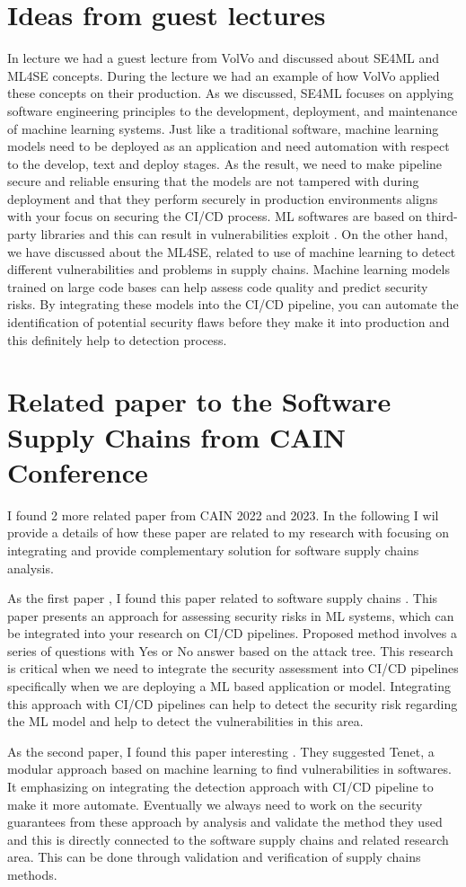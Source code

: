 \documentclass[11pt]{article}
\begin{document}
\section{Ideas from guest lectures}
In lecture we had a guest lecture from VolVo and discussed about SE4ML and ML4SE concepts. During the lecture we had an example of how VolVo applied these concepts on their production. As we discussed, SE4ML focuses on applying software engineering principles to the development, deployment, and maintenance of machine learning systems. Just like a traditional software, machine learning models need to be deployed as an application and need automation with respect to the develop, text and deploy stages. As the result, we need to make pipeline secure and reliable ensuring that the models are not tampered with during deployment and that they perform securely in production environments aligns with your focus on securing the CI/CD process. ML softwares are based on third-party libraries and this can result in vulnerabilities exploit \cite{10020813}. On the other hand, we have discussed about the ML4SE, related to use of machine learning to detect different vulnerabilities and problems in supply chains. Machine learning models trained on large code bases can help assess code quality and predict security risks. By integrating these models into the CI/CD pipeline, you can automate the identification of potential security flaws before they make it into production and this definitely help to detection process.

\section{Related paper to the Software Supply Chains from CAIN Conference }
I found 2 more related paper from CAIN 2022 and 2023. In the following I wil provide a details of how these paper are related to my research with focusing on integrating and provide complementary solution for software supply chains analysis. 

As the first paper , I found this paper related to software supply chains \cite{9796391}. This paper presents an approach for assessing security risks in ML systems, which can be integrated into your research on CI/CD pipelines. Proposed method involves a series of questions with Yes or No answer based on the attack tree. This research is critical when we need to integrate the security assessment into CI/CD pipelines specifically when we are deploying a ML based application or model. Integrating this approach with CI/CD pipelines can help to detect the security risk regarding the ML model and help to detect the vulnerabilities in this area. 

As the second paper, I found this paper interesting  \cite{10164750}. They suggested Tenet, a modular approach based on machine learning to find vulnerabilities in softwares. It emphasizing on integrating the detection approach with CI/CD pipeline to make it more automate. Eventually we always need to work on the security guarantees from these approach by analysis and validate the method they used and this is directly connected to the software supply chains and related research area. This can be done through validation and verification of supply chains methods.


\end{document}
